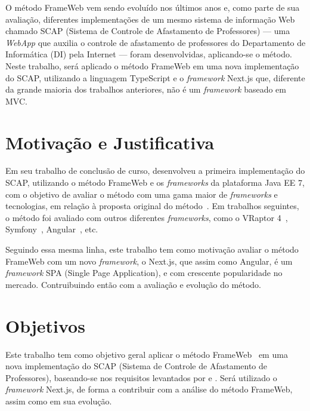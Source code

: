 O método FrameWeb vem sendo evoluído nos últimos anos e, como parte de sua avaliação, diferentes implementações de um mesmo 
sistema de informação Web chamado SCAP (Sistema de Controle de Afastamento de Professores) --- uma \textit{WebApp} que auxilia o 
controle de afastamento de professores do Departamento de Informática (DI) pela Internet --- foram desenvolvidas, aplicando-se o método. 
Neste trabalho, será aplicado o método FrameWeb em uma nova implementação do SCAP, utilizando
a linguagem TypeScript e o \textit{framework} Next.js que, diferente da grande maioria dos trabalhos anteriores, 
não é um \textit{framework} baseado em MVC.



\section{Motivação e Justificativa}
\label{sec-intro-motjus}

Em seu trabalho de conclusão de curso,  desenvolveu a primeira implementação do SCAP, utilizando o método FrameWeb e os
\textit{frameworks} da plataforma Java EE 7, com o objetivo de avaliar o método com uma gama maior de \textit{frameworks} e tecnologias,
em relação à proposta original do método~\cite{souza:2007}. Em trabalhos seguintes, o método foi
avaliado com outros diferentes \textit{frameworks}, como o VRaptor 4~\cite{prado:2015}, 
Symfony~\cite{berger:2019}, Angular~\cite{gomes:2022}, etc.

Seguindo essa mesma linha, este trabalho tem como motivação avaliar o método FrameWeb com um novo \textit{framework},
o Next.js, que assim como Angular, é um \textit{framework} SPA (Single Page Application), e com crescente popularidade 
no mercado. Contruibuindo então com a avaliação e evolução do método.



\section{Objetivos}
\label{sec-intro-obj}

Este trabalho tem como objetivo geral aplicar o método FrameWeb~\cite{souza:2007} em uma nova implementação do SCAP (Sistema de Controle de Afastamento de Professores),
baseando-se nos requisitos levantados por  e . Será utilizado o \textit{framework} Next.js, de forma a contribuir com a análise do método FrameWeb, assim como em sua evolução.

